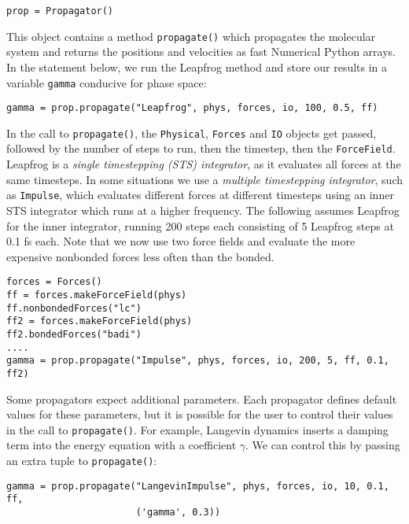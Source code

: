 \documentclass[11pt]{report}
\begin{document}
\begin{verbatim}
prop = Propagator()
\end{verbatim}

This object contains a method \texttt{propagate()} which propagates
the molecular system and returns the positions and velocities
as fast Numerical Python arrays.  In the statement below,
we run the Leapfrog method and store our results in a variable
\texttt{gamma} conducive for phase space:

\begin{verbatim}
gamma = prop.propagate("Leapfrog", phys, forces, io, 100, 0.5, ff)
\end{verbatim}

In the call to \texttt{propagate()}, the \texttt{Physical},
\texttt{Forces} and \texttt{IO} objects get passed, followed by the
number of steps to run, then the timestep, then the \texttt{ForceField}.
Leapfrog is a {\it single timestepping (STS) integrator}, as it evaluates
all forces at the same timesteps.
In some situations we use a {\it multiple timestepping integrator},
such as \texttt{Impulse}, which evaluates different forces
at different timesteps using an inner STS integrator which runs
at a higher frequency.  The following assumes Leapfrog
for the inner integrator, running 200 steps each consisting of 5 Leapfrog
steps at 0.1 fs each.  Note that we now use two force fields
and evaluate the more expensive nonbonded forces less often
than the bonded.

\begin{verbatim}
forces = Forces()
ff = forces.makeForceField(phys)
ff.nonbondedForces("lc")
ff2 = forces.makeForceField(phys)
ff2.bondedForces("badi")
....
gamma = prop.propagate("Impulse", phys, forces, io, 200, 5, ff, 0.1, ff2)
\end{verbatim}

Some propagators expect additional parameters.  Each propagator
defines default values for these parameters, but it is possible for the
user to control their values in the call to \texttt{propagate()}.
For example, Langevin dynamics inserts a damping term into
the energy equation with a coefficient \begin{math} \gamma \end{math}.
We can control this by passing an extra tuple to \texttt{propagate()}:

\begin{verbatim}
gamma = prop.propagate("LangevinImpulse", phys, forces, io, 10, 0.1, ff, 
                       ('gamma', 0.3))
\end{verbatim}
\end{document}

